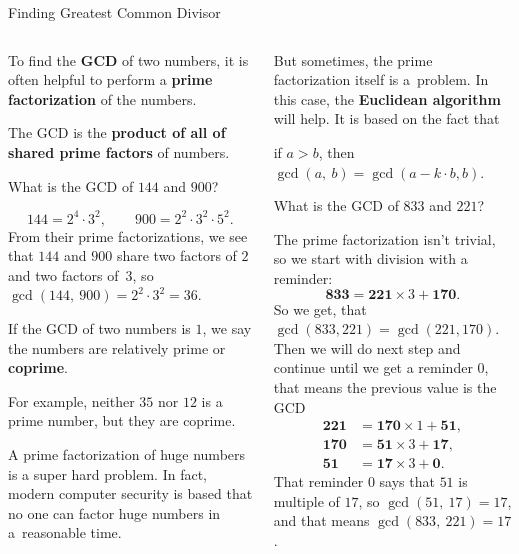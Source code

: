 \documentclass[9pt,aspectratio=169]{beamer}
\begin{document}
\begin{frame}{Finding Greatest Common Divisor}
  \begin{columns}[T]
    \begin{column}{0.5\textwidth}
        To find the \textbf{GCD} of two numbers, it is often helpful to perform a \textbf{prime factorization} of the numbers.

      \begin{definition}
        The GCD is the \textbf{product of all of shared prime factors} of numbers.
      \end{definition}

      \begin{problem}
        What is the GCD of $144$ and $900$?
      \end{problem}
      \vspace*{-1.8ex}
      \[ 144 = 2^4 \cdot 3^2, \qquad 900 = 2^2 \cdot 3^2 \cdot 5^2. \]
      From their prime factorizations, we see that $144$ and $900$ share two factors of $2$ and two factors of~$3$, so $\gcd(144,\ 900) = 2^2 \cdot 3^2 = 36$.

      \begin{example}
        If the GCD of two numbers is $1$, we say the numbers are relatively prime or \textbf{coprime}.                 
      \end{example}
      For example, neither $35$ nor $12$ is a prime number, but they are coprime.\smallskip 

      A prime factorization of huge numbers is a super hard problem. In fact, modern computer security is based that no one can factor huge numbers in a~reasonable time.
    \end{column}
    \begin{column}{0.5\textwidth}
      But sometimes, the prime factorization itself is a~problem. In this case, the \textbf{Euclidean algorithm} will help. It is based on the fact that 
      
      {\centering
      if $a > b$, then $\gcd(a,\ b) = \gcd(a − k \cdot b, b)$.}

      \begin{problem}
        What is the GCD of $833$ and $221$?        
      \end{problem}

      The prime factorization isn’t trivial, so we start with division with a reminder:
      \[ \mathbf{833} = \mathbf{221} × 3 + \mathbf{170}. \]
      So we get, that $\gcd(833, 221) = \gcd(221, 170)$. Then we will do next step and continue until we get a reminder $0$, that means the previous value is the GCD
      \begin{align*}
        \mathbf{221} &= \mathbf{170} × 1 + \mathbf{51}, \\
        \mathbf{170} &= \mathbf{51} × 3 + \mathbf{17}, \\
        \mathbf{51} &= \mathbf{17} × 3 + \mathbf{0}.                 
      \end{align*}
      That reminder $0$ says that $51$ is multiple of $17$, so $\gcd(51,\ 17) = 17$, and that means $\gcd(833,\ 221) = 17$. 
    \end{column}
  \end{columns}
\end{frame}
\end{document}

